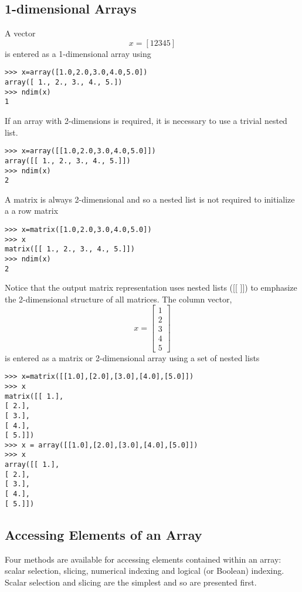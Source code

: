 \documentclass[KSmain.tex]{subfiles}
\begin{document}
\subsection{1-dimensional Arrays}
A vector
\[x = [1 2 3 4 5]\]
is entered as a 1-dimensional array using
\begin{framed}
\begin{verbatim}
>>> x=array([1.0,2.0,3.0,4.0,5.0])
array([ 1., 2., 3., 4., 5.])
>>> ndim(x)
1
\end{verbatim}
\end{framed}
If an array with 2-dimensions is required, it is necessary to use a trivial nested list.
\begin{framed}
\begin{verbatim}
>>> x=array([[1.0,2.0,3.0,4.0,5.0]])
array([[ 1., 2., 3., 4., 5.]])
>>> ndim(x)
2
\end{verbatim}
\end{framed}
A matrix is always 2-dimensional and so a nested list is not required to initialize a a row matrix
\begin{framed}
\begin{verbatim}
>>> x=matrix([1.0,2.0,3.0,4.0,5.0])
>>> x
matrix([[ 1., 2., 3., 4., 5.]])
>>> ndim(x)
2
\end{verbatim}
\end{framed}
Notice that the output matrix representation uses nested lists ([[ ]]) to emphasize the 2-dimensional
structure of all matrices. The column vector,
\[x =
\left[ 
\begin{array}{c}
1 \\
2 \\
3 \\
4 \\
5
\end{array}
\right]
\]
is entered as a matrix or 2-dimensional array using a set of nested lists
\begin{framed}
\begin{verbatim}
>>> x=matrix([[1.0],[2.0],[3.0],[4.0],[5.0]])
>>> x
matrix([[ 1.],
[ 2.],
[ 3.],
[ 4.],
[ 5.]])
>>> x = array([[1.0],[2.0],[3.0],[4.0],[5.0]])
>>> x
array([[ 1.],
[ 2.],
[ 3.],
[ 4.],
[ 5.]])
\end{verbatim}
\end{framed}
\newpage

\subsection{Accessing Elements of an Array}
Four methods are available for accessing elements contained within an array: scalar selection, slicing,
numerical indexing and logical (or Boolean) indexing. Scalar selection and slicing are the simplest and so
are presented first. 
\end{document}
